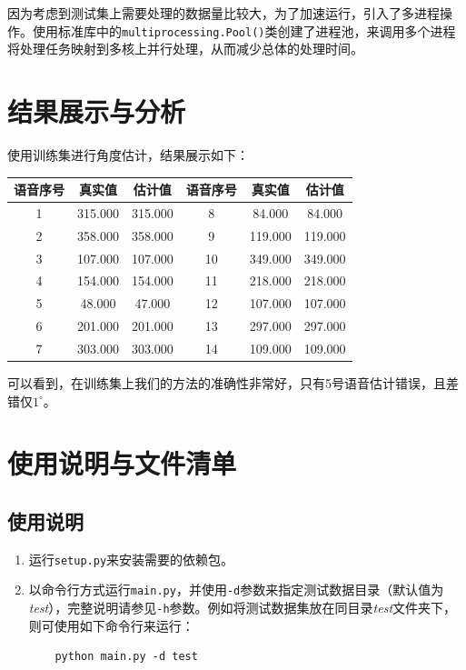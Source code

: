 \documentclass[a4paper]{ctexart}
\begin{document}
因为考虑到测试集上需要处理的数据量比较大，为了加速运行，引入了多进程操作。使用标准库中的\texttt{multiprocessing.Pool()}类创建了进程池，来调用多个进程将处理任务映射到多核上并行处理，从而减少总体的处理时间。

\section{结果展示与分析}
使用训练集进行角度估计，结果展示如下：

\begin{table}[h]
    \centering
    \begin{tabular}{ccc|ccc}
        \toprule
        语音序号 & 真实值 & 估计值 & 语音序号 & 真实值 & 估计值         \\
        \midrule
        1 & 315.000  & 315.000 & 8 & 84.000  & 84.000  \\ 
        2 & 358.000  & 358.000  & 9 & 119.000  & 119.000  \\ 
        3 & 107.000  & 107.000  & 10 & 349.000  & 349.000  \\  
        4 & 154.000  & 154.000  & 11 & 218.000  & 218.000  \\ 
        5 & 48.000  & 47.000  & 12 & 107.000  & 107.000  \\ 
        6 & 201.000  & 201.000  & 13 & 297.000  & 297.000  \\ 
        7 & 303.000  & 303.000  & 14 & 109.000  & 109.000  \\
        \bottomrule
    \end{tabular}
\end{table}

可以看到，在训练集上我们的方法的准确性非常好，只有5号语音估计错误，且差错仅$1^{\circ}$。

\section{使用说明与文件清单}

\subsection{使用说明}
\begin{enumerate}

    \item 运行\texttt{setup.py}来安装需要的依赖包。

    \item 以命令行方式运行\texttt{main.py}，并使用\texttt{-d}参数来指定测试数据目录（默认值为\textit{test}），完整说明请参见\texttt{-h}参数。例如将测试数据集放在同目录\textit{test}文件夹下，则可使用如下命令行来运行：
    
    \begin{verbatim}
    python main.py -d test
    \end{verbatim}
\end{enumerate}
\end{document}
